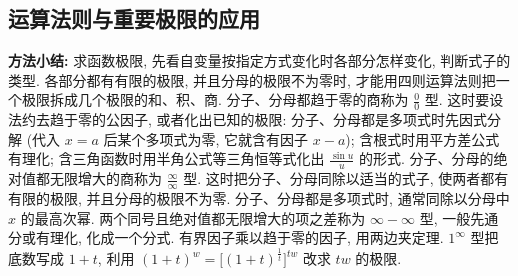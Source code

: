 \documentclass[UTF8,openany]{ctexbook}
\theoremstyle{chinesetextbook}
\begin{document}
\subsection{运算法则与重要极限的应用}
\par\indent\textbf{方法小结:} 求函数极限, 先看自变量按指定方式变化时各部分怎样变化, 判断式子的类型. 各部分都有有限的极限, 并且分母的极限不为零时, 才能用四则运算法则把一个极限拆成几个极限的和、积、商. 分子、分母都趋于零的商称为 $\displaystyle\frac00$ 型. 这时要设法约去趋于零的公因子, 或者化出已知的极限: 分子、分母都是多项式时先因式分解 (代入 $x=a$ 后某个多项式为零, 它就含有因子 $x-a$); 含根式时用平方差公式有理化; 含三角函数时用半角公式等三角恒等式化出 $\displaystyle\frac{\sin u}u$ 的形式. 分子、分母的绝对值都无限增大的商称为 $\displaystyle\frac\infty\infty$ 型. 这时把分子、分母同除以适当的式子, 使两者都有有限的极限, 并且分母的极限不为零. 分子、分母都是多项式时, 通常同除以分母中 $x$ 的最高次幂. 两个同号且绝对值都无限增大的项之差称为 $\infty-\infty$ 型, 一般先通分或有理化, 化成一个分式. 有界因子乘以趋于零的因子, 用两边夹定理. $1^\infty$ 型把底数写成 $1+t$, 利用 $(1+t)^w=\bigl[(1+t)^{\frac1t}\bigr]^{tw}$ 改求 $tw$ 的极限.
\end{document}
